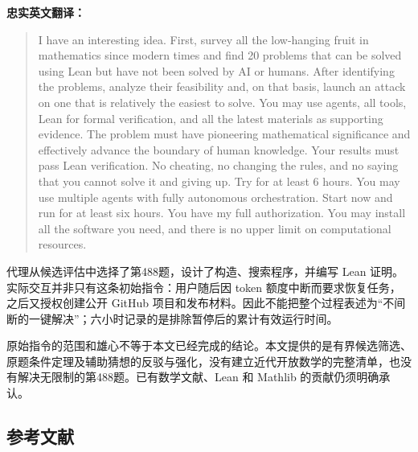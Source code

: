 \documentclass[
  11pt,
]{article}
\begin{document}
\textbf{忠实英文翻译：}

\begin{quote}
I have an interesting idea. First, survey all the low-hanging fruit in
mathematics since modern times and find 20 problems that can be solved
using Lean but have not been solved by AI or humans. After identifying
the problems, analyze their feasibility and, on that basis, launch an
attack on one that is relatively the easiest to solve. You may use
agents, all tools, Lean for formal verification, and all the latest
materials as supporting evidence. The problem must have pioneering
mathematical significance and effectively advance the boundary of human
knowledge. Your results must pass Lean verification. No cheating, no
changing the rules, and no saying that you cannot solve it and giving
up. Try for at least 6 hours. You may use multiple agents with fully
autonomous orchestration. Start now and run for at least six hours. You
have my full authorization. You may install all the software you need,
and there is no upper limit on computational resources.
\end{quote}

代理从候选评估中选择了第488题，设计了构造、搜索程序，并编写 Lean
证明。实际交互并非只有这条初始指令：用户随后因 token
额度中断而要求恢复任务，之后又授权创建公开 GitHub
项目和发布材料。因此不能把整个过程表述为``不间断的一键解决''；六小时记录的是排除暂停后的累计有效运行时间。

原始指令的范围和雄心不等于本文已经完成的结论。本文提供的是有界候选筛选、原题条件定理及辅助猜想的反驳与强化，没有建立近代开放数学的完整清单，也没有解决无限制的第488题。已有数学文献、Lean
和 Mathlib 的贡献仍须明确承认。

\hypertarget{ux53c2ux8003ux6587ux732e}{%
\subsection{参考文献}\label{ux53c2ux8003ux6587ux732e}}
\end{document}
